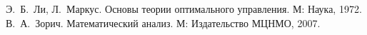 


        
        
        \tableofcontents
        
        
        
        
        \begin{thebibliography}{9}
                Э.~Б.~Ли, Л.~Маркус. Основы теории оптимального управления. М: Наука, 1972.
                В.~А.~Зорич. Математический анализ. М: Издательство МЦНМО, 2007.
        \end{thebibliography}
